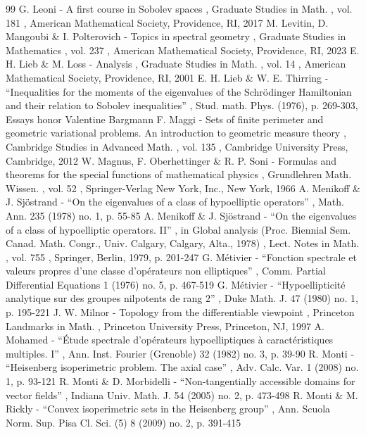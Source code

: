 \documentclass[11pt]{article}
\theoremstyle{definition}
\newcommand{\1}{\mathbbm{1}}
\numberwithin{equation}{section}
\begin{document}
\begin{thebibliography}{99}
 G. Leoni - A first course in Sobolev spaces , Graduate Studies in Math. , vol. 181 , American Mathematical Society, Providence, RI, 2017
 M. Levitin, D. Mangoubi \& I. Polterovich - Topics in spectral geometry , Graduate Studies in Mathematics , vol. 237 , American Mathematical Society, Providence, RI, 2023
 E. H. Lieb \& M. Loss - Analysis , Graduate Studies in Math. , vol. 14 , American Mathematical Society, Providence, RI, 2001
 E. H. Lieb \& W. E. Thirring - “Inequalities for the moments of the eigenvalues of the Schrödinger Hamiltonian and their relation to Sobolev inequalities” , Stud. math. Phys. (1976), p. 269-303, Essays honor Valentine Bargmann
 F. Maggi - Sets of finite perimeter and geometric variational problems. An introduction to geometric measure theory , Cambridge Studies in Advanced Math. , vol. 135 , Cambridge University Press, Cambridge, 2012
 W. Magnus, F. Oberhettinger \& R. P. Soni - Formulas and theorems for the special functions of mathematical physics , Grundlehren Math. Wissen. , vol. 52 , Springer-Verlag New York, Inc., New York, 1966
 A. Menikoff \& J. Sjöstrand - “On the eigenvalues of a class of hypoelliptic operators” , Math. Ann. 235 (1978) no. 1, p. 55-85
 A. Menikoff \& J. Sjöstrand - “On the eigenvalues of a class of hypoelliptic operators. II” , in Global analysis (Proc. Biennial Sem. Canad. Math. Congr., Univ. Calgary, Calgary, Alta., 1978) , Lect. Notes in Math. , vol. 755 , Springer, Berlin, 1979, p. 201-247
 G. Métivier - “Fonction spectrale et valeurs propres d’une classe d’opérateurs non elliptiques” , Comm. Partial Differential Equations 1 (1976) no. 5, p. 467-519
 G. Métivier - “Hypoellipticité analytique sur des groupes nilpotents de rang $2$” , Duke Math. J. 47 (1980) no. 1, p. 195-221
 J. W. Milnor - Topology from the differentiable viewpoint , Princeton Landmarks in Math. , Princeton University Press, Princeton, NJ, 1997
 A. Mohamed - “Étude spectrale d’opérateurs hypoelliptiques à caractéristiques multiples. I” , Ann. Inst. Fourier (Grenoble) 32 (1982) no. 3, p. 39-90
 R. Monti - “Heisenberg isoperimetric problem. The axial case” , Adv. Calc. Var. 1 (2008) no. 1, p. 93-121
 R. Monti \& D. Morbidelli - “Non-tangentially accessible domains for vector fields” , Indiana Univ. Math. J. 54 (2005) no. 2, p. 473-498
 R. Monti \& M. Rickly - “Convex isoperimetric sets in the Heisenberg group” , Ann. Scuola Norm. Sup. Pisa Cl. Sci. (5) 8 (2009) no. 2, p. 391-415

\end{thebibliography}
\end{document}
